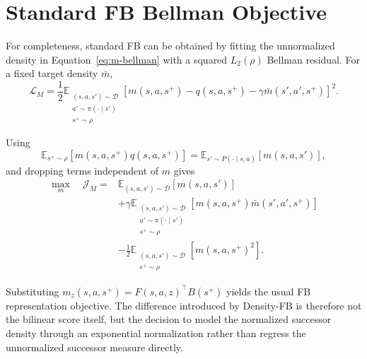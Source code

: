 \documentclass[11pt]{article}
\begin{document}
\section{Standard FB Bellman Objective}
\label{app:standard-fb}

For completeness, standard FB can be obtained by fitting the unnormalized density in Equation~\eqref{eq:m-bellman} with a squared $L_2(\rho)$ Bellman residual. For a fixed target density $\bar m$,
\begin{equation}
    \mathcal L_M
    =
    \frac12
    \mathbb E_{\substack{
        (s,a,s')\sim\mathcal D\\
        a'\sim\pi(\cdot\mid s')\\
        s^+\sim\rho
    }}
    \left[
        m(s,a,s^+)
        -
        q(s,a,s^+)
        -
        \gamma\bar m(s',a',s^+)
    \right]^2.
    \label{eq:standard-fb-square}
\end{equation}

Using
\[
    \mathbb E_{s^+\sim\rho}
    \left[
        m(s,a,s^+)q(s,a,s^+)
    \right]
    =
    \mathbb E_{s'\sim P(\cdot\mid s,a)}
    \left[
        m(s,a,s')
    \right],
\]
and dropping terms independent of $m$ gives
\begin{equation}
\begin{aligned}
    \max_m\quad
    \mathcal J_M
    ={}&
    \mathbb E_{(s,a,s')\sim\mathcal D}
    \left[
        m(s,a,s')
    \right]
    \\
    &+
    \gamma
    \mathbb E_{\substack{
        (s,a,s')\sim\mathcal D\\
        a'\sim\pi(\cdot\mid s')\\
        s^+\sim\rho
    }}
    \left[
        m(s,a,s^+)\bar m(s',a',s^+)
    \right]
    \\
    &-
    \frac12
    \mathbb E_{\substack{
        (s,a,s')\sim\mathcal D\\
        s^+\sim\rho
    }}
    \left[
        m(s,a,s^+)^2
    \right].
\end{aligned}
\label{eq:standard-fb-objective}
\end{equation}

Substituting $m_z(s,a,s^+)=F(s,a,z)^\top B(s^+)$ yields the usual FB representation objective. The difference introduced by Density-FB is therefore not the bilinear score itself, but the decision to model the normalized successor density through an exponential normalization rather than regress the unnormalized successor measure directly.
\end{document}
